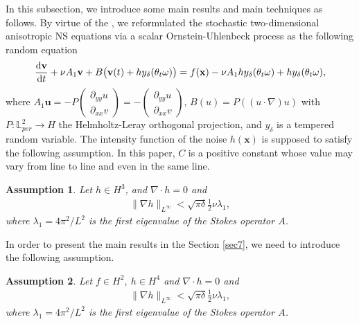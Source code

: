 \documentclass{elsarticle}
\newtheorem{assumption}{Assumption}
\theoremstyle{definition}
\numberwithin{equation}{section}
\newcommand{\LL}{\mathbb{L}_{per}}
\renewcommand{\d}{{\rm{d}}}
\begin{document}
In this subsection, we introduce some main results and main techniques as follows. By virtue of the \cite{crauel}, we reformulated the  stochastic two-dimensional anisotropic  NS equations via a scalar Ornstein-Uhlenbeck process
as the following random equation
\begin{align}\label{3}
\frac{\d \textbf{v}}{\d t}+ \nu A_1\textbf{v}+B\big( \textbf{v}(t)+hy_\delta(\theta_t\omega)\big)=f(\textbf{x})-  \nu A_1hy_\delta(\theta_t\omega)+hy_\delta (\theta_t\omega),
\end{align}
where $A_1\textbf{u}=-P\left(
\begin{array}{ccc}
\partial_{yy}u\\ \partial_{xx}v
\end{array}\right)=-\left(
\begin{array}{ccc}
\partial_{yy}u\\ \partial_{xx}v
\end{array}\right)$, $B(u)=P((u\cdot \nabla)u)$ with $P:\LL^2\to H$ the Helmholtz-Leray orthogonal projection, and   $y_\delta$ is a tempered random variable.  The intensity  function of the noise $h(\textbf{x})$ is supposed to satisfy  the following assumption. In this paper, $C$ is a positive constant whose value may vary from line to line and even in the same line.




\begin{assumption} \label{assum}
Let    $ h \in H^3$, and $\nabla\cdot h=0$ and
 \begin{align*}
  \|\nabla h\|_{L^\infty} <  \sqrt {\pi\delta} \frac{1}{2}\nu \lambda_1 ,
 \end{align*}
where  $\lambda_1 = 4\pi^2 /L^2$ is the first eigenvalue of the Stokes operator $A$.
  \end{assumption}
In order to present the main results in the Section \ref{sec7}, we need to introduce the following assumption.

\begin{assumption} \label{assum1}
Let  $f\in H^2$,  $ h \in H^4$ and $\nabla\cdot h=0$ and
 \begin{align*}
  \|\nabla h\|_{L^\infty} <  \sqrt {\pi\delta} \frac{1}{2}\nu \lambda_1 ,
 \end{align*}
where  $\lambda_1 = 4\pi^2 /L^2$ is the first eigenvalue of the Stokes operator $A$.
  \end{assumption}
\end{document}

